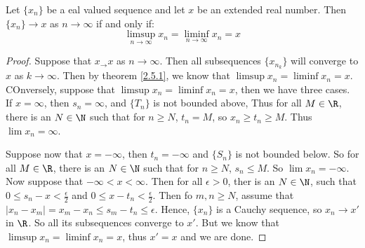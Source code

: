 \begin{theorem}\label{2.5.2}
    Let $\{x_n\}$ be a eal valued sequence and let  $x$ be an extended real number.
    Then $\{x_n\} \rightarrow x$ as  $n \rightarrow \infty$ if and only if:
        \begin{equation*}
            \limsup_{n \rightarrow \infty}{x_n}=
            \liminf_{n \rightarrow \infty}{x_n}=x
        \end{equation*}
\end{theorem}
\begin{proof}
    Suppose that $x_ \rightarrow x$ as  $n \rightarrow \infty$. Then all subsequences  
    $\{x_{n_k}\}$ will converge to  $x$ as  $k \rightarrow \infty$. Then by theorem 
    \ref{2.5.1}, we know that $\limsup{x_n}=\liminf{x_n}=x$. COnversely, suppose 
    that  $\limsup{x_n}=\liminf{x_n}=x$, then we have three cases. If  $x=\infty$, 
    then  $s_n=\infty$, and  $\{T_n\}$ is not bounded above, Thus for all  $M \in \R$, 
    there is an  $N \in \N$ such that  for $n \geq N$,  $t_n=M$, so  $x_n \geq t_n \geq M$.
    Thus  $\lim{x_n}=\infty$.

    Suppose now that  $x=-\infty$, then  $t_n=-\infty$ and  $\{S_n\}$ is not bounded below.
    So for all  $M \in \R$, there is an  $N \in \N$ such that for  $n \geq N$,  $s_n \leq M$. 
    So  $\lim{x_n}=-\infty$. Now suppose that $-\infty<x<\infty$. Then for all  $\epsilon>0$, 
    ther is an  $N \in \N$, such that  $0 \leq s_n-x<\frac{\epsilon}{2}$ and 
    $0 \leq x-t_n<\frac{\epsilon}{2}$. Then fo $m,n \geq N$, assume that  
    $|x_n-x_m|=x_m-x_n \leq s_m-t_n \leq \epsilon$. Hence, $\{x_n\}$ is a Cauchy 
    sequence, so  $x_n \rightarrow x'$ in  $\R$. So all its subsequences converge 
    to  $x'$. But we know that  $\limsup{x_n}=\liminf{x_n}=x$, thus  $x'=x$ and 
    we are done.
\end{proof}

